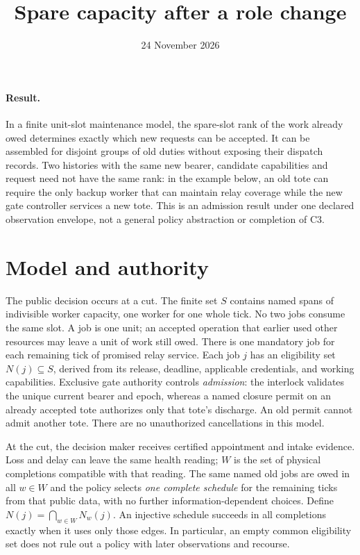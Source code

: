 \documentclass[11pt]{article}
\title{Spare capacity after a role change}
\author{}
\date{24 November 2026}
\begin{document}
\maketitle

\paragraph{Result.} In a finite unit-slot maintenance model, the spare-slot rank of the work already owed determines exactly which new requests can be accepted. It can be assembled for disjoint groups of old duties without exposing their dispatch records. Two histories with the same new bearer, candidate capabilities and request need not have the same rank: in the example below, an old tote can require the only backup worker that can maintain relay coverage while the new gate controller services a new tote. This is an admission result under one declared observation envelope, not a general policy abstraction or completion of C3.

\section{Model and authority}
The public decision occurs at a cut. The finite set $S$ contains named spans of indivisible worker capacity, one worker for one whole tick. No two jobs consume the same slot. A job is one unit; an accepted operation that earlier used other resources may leave a unit of work still owed. There is one mandatory job for each remaining tick of promised relay service. Each job $j$ has an eligibility set $N(j)\subseteq S$, derived from its release, deadline, applicable credentials, and working capabilities. Exclusive gate authority controls \emph{admission}: the interlock validates the unique current bearer and epoch, whereas a named closure permit on an already accepted tote authorizes only that tote's discharge. An old permit cannot admit another tote. There are no unauthorized cancellations in this model.

At the cut, the decision maker receives certified appointment and intake evidence. Loss and delay can leave the same health reading; $W$ is the set of physical completions compatible with that reading. The same named old jobs are owed in all $w\in W$ and the policy selects \emph{one complete schedule} for the remaining ticks from that public data, with no further information-dependent choices. Define $N(j)=\bigcap_{w\in W}N_w(j)$. An injective schedule succeeds in all completions exactly when it uses only those edges. In particular, an empty common eligibility set does not rule out a policy with later observations and recourse.
\end{document}
